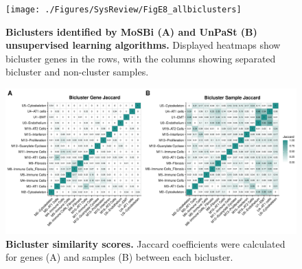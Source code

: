 \documentclass[
]{article}
\begin{document}
\begin{figure}

{\centering \texttt{[image: ./Figures/SysReview/FigE8\_allbiclusters]} 

}

\caption[All biclusters]{\textbf{Biclusters identified by MoSBi (A) and UnPaSt (B) unsupervised learning algorithms.} Displayed heatmaps show bicluster genes in the rows, with the columns showing separated bicluster and non-cluster samples.}\label{fig:biclusterall}
\end{figure}



\begin{figure}
\includegraphics[width=1\linewidth,]{./Figures/SysReview/FigE9_biclusterjaccard} \caption[Bicluster similarity]{\textbf{Bicluster similarity scores.} Jaccard coefficients were calculated for genes (A) and samples (B) between each bicluster.}\label{fig:biclusterjaccard}
\end{figure}
\end{document}
